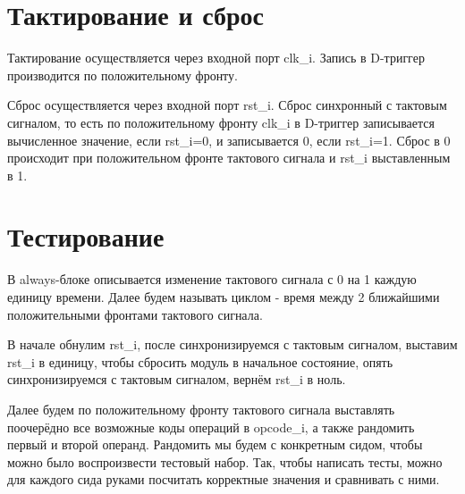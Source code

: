 \documentclass[12pt]{extarticle}
\begin{document}
\section{Тактирование и сброс}

Тактирование осуществляется через входной порт clk\_i. Запись в D-триггер производится по положительному фронту. 

Сброс осуществляется через входной порт rst\_i. Сброс синхронный с тактовым сигналом, то есть по положительному фронту clk\_i в D-триггер записывается вычисленное значение, если rst\_i=0, и записывается 0, если rst\_i=1. Сброс в 0 происходит при положительном фронте тактового сигнала и rst\_i выставленным в 1.

\section{Тестирование}

В always-блоке описывается изменение тактового сигнала с 0 на 1 каждую единицу времени. Далее будем называть циклом - время между 2 ближайшими положительными фронтами тактового сигнала.

В начале обнулим rst\_i, после синхронизируемся с тактовым сигналом, выставим rst\_i в единицу, чтобы сбросить модуль в начальное состояние, опять синхронизируемся с тактовым сигналом, вернём rst\_i в ноль. 

Далее будем по положительному фронту тактового сигнала выставлять поочерёдно все возможные коды операций в opcode\_i, а также рандомить первый и второй операнд. Рандомить мы будем с конкретным сидом, чтобы можно было воспроизвести тестовый набор. Так, чтобы написать тесты, можно для каждого сида руками посчитать корректные значения и сравнивать с ними.
\end{document}
